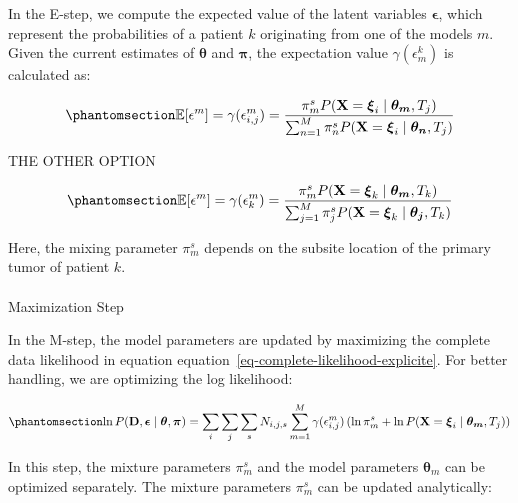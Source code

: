 \documentclass[
  sn-mathphys-num,
]{sn-jnl}
\makeatletter
\let\oldparagraph\paragraph
\renewcommand{\paragraph}{
    \@ifstar
      \xxxParagraphStar
      \xxxParagraphNoStar
  }
\newcommand{\xxxParagraphStar}[1]{\oldparagraph*{#1}\mbox{}}
\newcommand{\xxxParagraphNoStar}[1]{\oldparagraph{#1}\mbox{}}
\makeatother
\begin{document}
In the E-step, we compute the expected value of the latent variables
\(\boldsymbol{\epsilon}\), which represent the probabilities of a
patient \(k\) originating from one of the models \(m\). Given the
current estimates of \(\boldsymbol{\theta}\) and \(\boldsymbol{\pi}\),
the expectation value \(\gamma(\epsilon_m^k)\) is calculated as:

\begin{equation}\phantomsection\label{eq-expectation-step}{
\mathbb{E}[\epsilon^m] = \gamma(\epsilon^m_{i,j}) = \frac{\pi_m^s P(\mathbf{X} = \boldsymbol{\xi}_i \mid \boldsymbol{\theta_m}, T_j)}{\sum_{n=1}^M \pi_n^s P(\mathbf{X} = \boldsymbol{\xi}_i \mid \boldsymbol{\theta_n}, T_j)}
}\end{equation}

THE OTHER OPTION

\begin{equation}\phantomsection\label{eq-expectation-step2}{
\mathbb{E}[\epsilon^m] = \gamma(\epsilon^m_k) = \frac{\pi_m^s P(\mathbf{X} = \boldsymbol{\xi}_k \mid \boldsymbol{\theta_m}, T_k)}{\sum_{j=1}^M \pi_j^s P(\mathbf{X} = \boldsymbol{\xi}_k \mid \boldsymbol{\theta_j}, T_k)}
}\end{equation}

Here, the mixing parameter \(\pi_m^s\) depends on the subsite location
of the primary tumor of patient \(k\).

\paragraph{Maximization Step}\label{maximization-step}

In the M-step, the model parameters are updated by maximizing the
complete data likelihood in equation
equation~\ref{eq-complete-likelihood-explicite}. For better handling, we
are optimizing the log likelihood:

\begin{equation}\phantomsection\label{eq-maximization-step}{
\ln P(\mathbf{D}, \boldsymbol{\epsilon} \mid \boldsymbol{\theta}, \boldsymbol{\pi}) = \sum_{i} \sum_j \sum_{s} N_{i,j,s} \sum_{m=1}^M \gamma(\epsilon^m_{i,j}) \left( \ln \pi_m^s + \ln P(\mathbf{X} = \boldsymbol{\xi}_i \mid \boldsymbol{\theta_m}, T_j) \right)
}\end{equation}

In this step, the mixture parameters \(\pi_m^s\) and the model
parameters \(\boldsymbol{\theta}_m\) can be optimized separately. The
mixture parameters \(\pi_m^s\) can be updated analytically:
\end{document}
